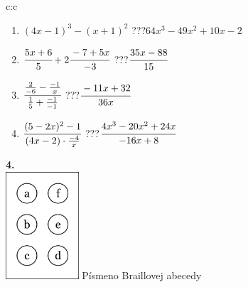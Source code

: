 \documentclass[10pt]{report}
\begin{document}
\begin{tabular}{c:c}
\begin{minipage}[c][104.5mm][t]{0.5\linewidth}
\begin{center}
\begin{minipage}{0.79\linewidth}
\begin{center}
\begin{varwidth}{\linewidth}
\begin{enumerate}
\item $(4x-1)^3-(x+1)^2$\quad \dotfill\; ???\;\dotfill \quad $64x^3-49x^2+10x-2$
\item $\cfrac{5x+6}{5}+2\cfrac{-7+5x}{-3}$\quad \dotfill\; ???\;\dotfill \quad $\cfrac{35x-88}{15}$
\item $\cfrac{\frac{2}{-6}-\frac{-1}{x}}{\frac{1}{5}+\frac{-1}{-1}}$\quad \dotfill\; ???\;\dotfill \quad $\cfrac{-11x+32}{36x}$
\item $\cfrac{(5-2x)^2-1}{(4x-2)\cdot\frac{-4}{x}}$\quad \dotfill\; ???\;\dotfill \quad $\cfrac{4x^3-20x^2+24x}{-16x+8}$
\end{enumerate}
\end{varwidth}
\end{center}
\end{minipage}
\begin{minipage}{0.20\linewidth}
\begin{center}
{\Huge\bfseries 4.} \\[2mm]
\includegraphics[height=40mm]{../images/braille.png}
{\small Písmeno Braillovej abecedy}
\end{center}
\end{minipage}
\end{center}
\end{minipage}
%
\end{tabular}
\newpage
\thispagestyle{empty}
\end{document}

